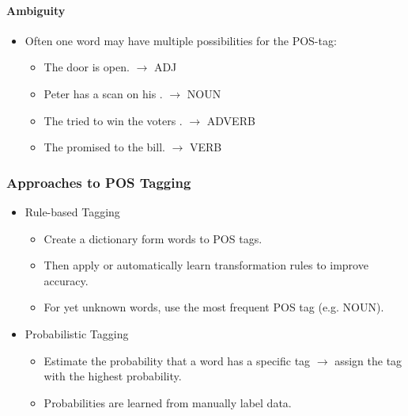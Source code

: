                \paragraph{Ambiguity} %
                    \begin{itemize}
                    	\item Often one word may have multiple possibilities for the POS-tag:
                    		\begin{itemize}
                    			\item The  door is open. \( \rightarrow \) ADJ
                    			\item Peter has a scan on his . \( \rightarrow \) NOUN
                    			\item The tried to win the voters . \( \rightarrow \) ADVERB
                    			\item The promised to  the bill. \( \rightarrow \) VERB
                    		\end{itemize}
                    \end{itemize}

            \subsubsection{Approaches to  POS Tagging} %
                \begin{itemize}
                	\item Rule-based Tagging
                		\begin{itemize}
                			\item Create a dictionary form words to POS tags.
                			\item Then apply or automatically learn transformation rules to improve accuracy.
                			\item For yet unknown words, use the most frequent POS tag (e.g. NOUN).
                		\end{itemize}
                	\item Probabilistic Tagging
                		\begin{itemize}
                			\item Estimate the probability that a word has a specific tag \( \rightarrow \) assign the tag with the highest probability.
                			\item Probabilities are learned from manually label data.
                		\end{itemize}
                \end{itemize}

